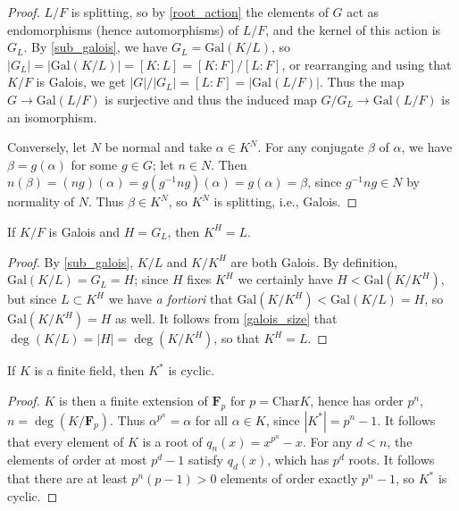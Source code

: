 \begin{proof} $L/F$ is splitting, so by \ref{root_action} the elements of $G$
act as endomorphisms (hence automorphisms) of $L/F$, and the kernel of this
action is $G_L$. By
\ref{sub_galois}, we have $G_L = \text{Gal}(K/L)$, so $|G_L| = |\text{Gal}(K/L)| = [K : L]
= [K : F] / [L : F]$,
or rearranging and using that $K/F$ is Galois, we get $|G|/|G_L| = [L : F] =
|\text{Gal}(L/F)|$. Thus the map $G \to \text{Gal}(L/F)$ is surjective and thus the
induced map $G/G_L \to
\text{Gal}(L/F)$ is an isomorphism.

Conversely, let $N$ be normal and take $\alpha \in K^N$. For any conjugate
$\beta$ of $\alpha$, we
have $\beta = g(\alpha)$ for some $g \in G$; let $n \in N$. Then $n(\beta) =
(ng)(\alpha) =
g(g^{-1} n g)(\alpha) = g(\alpha) = \beta$, since $g^{-1} n g \in N$ by
normality of $N$. Thus
$\beta \in K^N$, so $K^N$ is splitting, i.e., Galois. \end{proof}

\begin{proposition} If $K/F$ is Galois and $H = G_L$, then $K^H = L$.
\label{fixed_field}
\end{proposition}

\begin{proof} By \ref{sub_galois}, $K/L$ and $K/K^H$ are both Galois. By
definition, $\text{Gal}(K/L) = G_L = H$; since $H$ fixes $K^H$ we certainly have
$H < \text{Gal}(K/K^H)$, but since $L \subset K^H$ we have \emph{a fortiori} that
$\text{Gal}(K/K^H) < \text{Gal}(K/L) = H$, so $\text{Gal}(K/K^H) = H$ as well. It follows
from \ref{galois_size} that $\deg(K/L) = |H| = \deg(K/K^H)$, so that $K^H =
L$. \end{proof}

\begin{lemma} If $K$ is a finite field, then $K^\ast$ is cyclic.
\label{fin_cyclic}
\end{lemma}

\begin{proof} $K$ is then a finite extension of $\mathbf{F}_p$ for $p =
\text{Char}{K}$, hence has order $p^n$, $n = \deg(K/\mathbf{F}_p)$. Thus
$\alpha^{p^n} = \alpha$ for all $\alpha \in K$, since $|K^\ast| = p^n - 1$.
It follows that every element of $K$ is a root of $q_n(x) = x^{p^n} - x$. For
any $d < n$, the elements of order at most $p^d - 1$ satisfy $q_d(x)$, which has
$p^d$ roots. It follows that there are at least $p^n(p - 1) > 0$ elements of
order exactly $p^n - 1$, so $K^\ast$ is cyclic. \end{proof}

